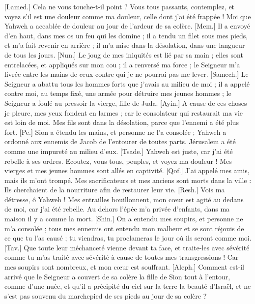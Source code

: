 \begin{multicols}{2}
[Lamed.] Cela ne vous touche-t-il point ? Vous tous passants, contemplez, et voyez s'il est une douleur comme ma douleur, celle dont j'ai été frappée ! Moi que Yahweh a accablée de douleur au jour de l'ardeur de sa colère.
[Mem.] Il a envoyé d'en haut, dans mes os un feu qui les domine ; il a tendu un filet sous mes pieds, et m'a fait revenir en arrière ; il m'a mise dans la désolation, dans une langueur de tous les jours.
[Nun.] Le joug de mes iniquités est lié par sa main ; elles sont entrelacées, et appliqués sur mon cou ; il a renversé ma force ; le Seigneur m’a livrée entre les mains de ceux contre qui je ne pourrai pas me lever.
[Samech.] Le Seigneur a abattu tous les hommes forts que j'avais au milieu de moi ; il a appelé contre moi, au temps fixé, une armée pour détruire mes jeunes hommes ; le Seigneur a foulé au pressoir la vierge, fille de Juda.
[Ayin.] A cause de ces choses je pleure, mes yeux fondent en larmes ; car le consolateur qui restaurait ma vie est loin de moi. Mes fils sont dans la désolation, parce que l'ennemi a été plus fort.
[Pe.] Sion a étendu les mains, et personne ne l'a consolée ; Yahweh a ordonné aux ennemis de Jacob de l’entourer de toutes parts. Jérusalem a été comme une impureté au milieu d'eux.
[Tsade.] Yahweh est juste, car j'ai été rebelle à ses ordres. Ecoutez, vous tous, peuples, et voyez ma douleur ! Mes vierges et mes jeunes hommes sont allés en captivité.
[Qof.] J'ai appelé mes amis, mais ils m'ont trompé. Mes sacrificateurs et mes anciens sont morts dans la ville : Ils cherchaient de la nourriture afin de restaurer leur vie.
[Resh.] Vois ma détresse, ô Yahweh ! Mes entrailles bouillonnent, mon cœur est agité au dedans de moi, car j'ai été rebelle. Au dehors l’épée m’a privée d’enfants, dans ma maison il y a comme la mort.
[Shin.] On a entendu mes soupirs, et personne ne m'a consolée ; tous mes ennemis ont entendu mon malheur et se sont réjouis de ce que tu l’as causé ; tu viendras, tu proclameras le jour où ils seront comme moi.
[Tav.] Que toute leur méchanceté vienne devant ta face, et traite-les avec sévérité comme tu m'as traité avec sévérité à cause de toutes mes transgressions ! Car mes soupirs sont nombreux, et mon cœur est souffrant.
\VerseOne{}[Aleph.] Comment est-il arrivé que le Seigneur a couvert  de sa colère la fille de Sion tout à l’entour, comme d’une nuée, et qu’il a précipité du ciel sur la terre la beauté d’Israël, et ne s’est pas souvenu du marchepied de ses pieds au jour de sa colère ?

\end{multicols}
